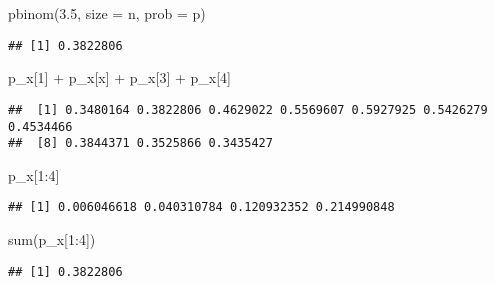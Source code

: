 \documentclass[
]{article}
\newenvironment{Shaded}{\begin{snugshade}}{\end{snugshade}}
\newcommand{\AttributeTok}[1]{\textcolor[rgb]{0.77,0.63,0.00}{#1}}
\newcommand{\DecValTok}[1]{\textcolor[rgb]{0.00,0.00,0.81}{#1}}
\newcommand{\FloatTok}[1]{\textcolor[rgb]{0.00,0.00,0.81}{#1}}
\newcommand{\FunctionTok}[1]{\textcolor[rgb]{0.00,0.00,0.00}{#1}}
\newcommand{\NormalTok}[1]{#1}
\newcommand{\SpecialCharTok}[1]{\textcolor[rgb]{0.00,0.00,0.00}{#1}}
\begin{document}
\begin{Shaded}
\begin{Highlighting}[]
\FunctionTok{pbinom}\NormalTok{(}\FloatTok{3.5}\NormalTok{, }\AttributeTok{size =}\NormalTok{ n, }\AttributeTok{prob =}\NormalTok{ p)}
\end{Highlighting}
\end{Shaded}

\begin{verbatim}
## [1] 0.3822806
\end{verbatim}

\begin{Shaded}
\begin{Highlighting}[]
\NormalTok{p\_x[}\DecValTok{1}\NormalTok{] }\SpecialCharTok{+}\NormalTok{ p\_x[x] }\SpecialCharTok{+}\NormalTok{ p\_x[}\DecValTok{3}\NormalTok{] }\SpecialCharTok{+}\NormalTok{ p\_x[}\DecValTok{4}\NormalTok{]}
\end{Highlighting}
\end{Shaded}

\begin{verbatim}
##  [1] 0.3480164 0.3822806 0.4629022 0.5569607 0.5927925 0.5426279 0.4534466
##  [8] 0.3844371 0.3525866 0.3435427
\end{verbatim}

\begin{Shaded}
\begin{Highlighting}[]
\NormalTok{p\_x[}\DecValTok{1}\SpecialCharTok{:}\DecValTok{4}\NormalTok{]}
\end{Highlighting}
\end{Shaded}

\begin{verbatim}
## [1] 0.006046618 0.040310784 0.120932352 0.214990848
\end{verbatim}

\begin{Shaded}
\begin{Highlighting}[]
\FunctionTok{sum}\NormalTok{(p\_x[}\DecValTok{1}\SpecialCharTok{:}\DecValTok{4}\NormalTok{])}
\end{Highlighting}
\end{Shaded}

\begin{verbatim}
## [1] 0.3822806
\end{verbatim}
\end{document}

